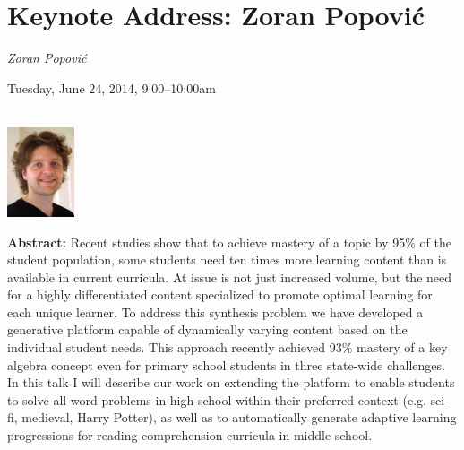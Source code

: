 \section{Keynote Address: Zoran Popović}
\begin{center}

\begin{Large}
{\bfseries\Large ``Text Generation for Infinitely Adaptable Curricula''}}\vspace{1em}\par
\end{Large}

{\itshape Zoran Popović}\vspace{1em}\par
Tuesday, June 24, 2014, 9:00--10:00am \vspace{1em}\\
\PlenaryLoc \\
\vspace{1em}\par
\includegraphics[height=100px]{content/tuesday/popovic-headshot.jpg}
\end{center}

\noindent
{\bfseries Abstract:} Recent studies show that to achieve mastery of a
topic by 95\% of the student population, some students need ten times
more learning content than is available in current curricula.  At
issue is not just increased volume, but the need for a highly
differentiated content specialized to promote optimal learning for
each unique learner.  To address this synthesis problem we have
developed a generative platform capable of dynamically varying content
based on the individual student needs.  This approach recently
achieved 93\% mastery of a key algebra concept even for primary school
students in three state-wide challenges.  In this talk I will describe
our work on extending the platform to enable students to solve all
word problems in high-school within their preferred context
(e.g. sci-fi, medieval, Harry Potter), as well as to automatically
generate adaptive learning progressions for reading comprehension
curricula in middle school.

\vspace{3em}\par 

